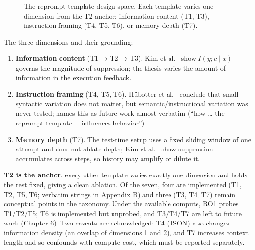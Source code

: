 \documentclass[12pt,a4paper]{report}
\providecommand{\tightlist}{\setlength{\itemsep}{0pt}\setlength{\parskip}{0pt}}
\begin{document}
\begin{figure}[H]
\centering
{}
\caption{The reprompt-template design space. Each template varies one dimension from the T2 anchor: information content (T1, T3), instruction framing (T4, T5, T6), or memory depth (T7).}
\label{fig:template-space}
\end{figure}

The three dimensions and their grounding:

\begin{enumerate}
\def\labelenumi{\arabic{enumi}.}
\tightlist
\item
  \textbf{Information content} (T1 → T2 → T3). Kim et al.~\cite{r2} show \(I(y; c \mid x)\) governs the magnitude of suppression; the thesis varies the amount of information in the execution feedback.
\item
  \textbf{Instruction framing} (T4, T5, T6). Hübotter et al.~\cite{r1} conclude that small syntactic variation does not matter, but semantic/instructional variation was never tested; \cite{r1} names this as future work almost verbatim (``how \ldots{} the reprompt template \ldots{} influences behavior'').
\item
  \textbf{Memory depth} (T7). The test-time setup \cite{r1} uses a fixed sliding window of one attempt and does not ablate depth; Kim et al.~\cite{r2} show suppression accumulates across steps, so history may amplify or dilute it.
\end{enumerate}

\textbf{T2 is the anchor}: every other template varies exactly one dimension and holds the rest fixed, giving a clean ablation. Of the seven, four are implemented (T1, T2, T5, T6; verbatim strings in Appendix B) and three (T3, T4, T7) remain conceptual points in the taxonomy. Under the available compute, RO1 probes T1/T2/T5; T6 is implemented but unprobed, and T3/T4/T7 are left to future work (Chapter 6). Two caveats are acknowledged: T4 (JSON) also changes information density (an overlap of dimensions 1 and 2), and T7 increases context length and so confounds with compute cost, which must be reported separately.
\end{document}

